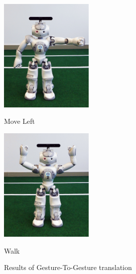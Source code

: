 \begin{figure}
\begin{minipage}
		\includegraphics[height=55mm]{figures/result/nao-gg-move-left.jpg} \caption*{Move Left}
	\end{minipage}
	\begin{minipage}
		{.4
			\textwidth}  
		\centering
		\includegraphics[height=55mm]{figures/result/nao-gg-walk.jpg} 
		\caption*{Walk}
	\end{minipage}	
	\caption{Results of Gesture-To-Gesture translation}
	\label{res:gg}
\end{figure}
